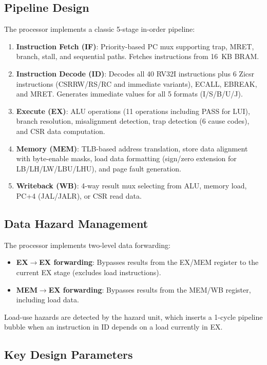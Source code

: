 \documentclass[conference]{IEEEtran}
\begin{document}
\subsection{Pipeline Design}

The processor implements a classic 5-stage in-order pipeline:

\begin{enumerate}
    \item \textbf{Instruction Fetch (IF)}: Priority-based PC mux supporting trap, MRET, branch, stall, and sequential paths. Fetches instructions from 16~KB BRAM.
    \item \textbf{Instruction Decode (ID)}: Decodes all 40 RV32I instructions plus 6 Zicsr instructions (CSRRW/RS/RC and immediate variants), ECALL, EBREAK, and MRET. Generates immediate values for all 5 formats (I/S/B/U/J).
    \item \textbf{Execute (EX)}: ALU operations (11 operations including PASS for LUI), branch resolution, misalignment detection, trap detection (6 cause codes), and CSR data computation.
    \item \textbf{Memory (MEM)}: TLB-based address translation, store data alignment with byte-enable masks, load data formatting (sign/zero extension for LB/LH/LW/LBU/LHU), and page fault generation.
    \item \textbf{Writeback (WB)}: 4-way result mux selecting from ALU, memory load, PC+4 (JAL/JALR), or CSR read data.
\end{enumerate}

\subsection{Data Hazard Management}

The processor implements two-level data forwarding:
\begin{itemize}
    \item \textbf{EX$\rightarrow$EX forwarding}: Bypasses results from the EX/MEM register to the current EX stage (excludes load instructions).
    \item \textbf{MEM$\rightarrow$EX forwarding}: Bypasses results from the MEM/WB register, including load data.
\end{itemize}

Load-use hazards are detected by the hazard unit, which inserts a 1-cycle pipeline bubble when an instruction in ID depends on a load currently in EX.

\subsection{Key Design Parameters}
\end{document}
